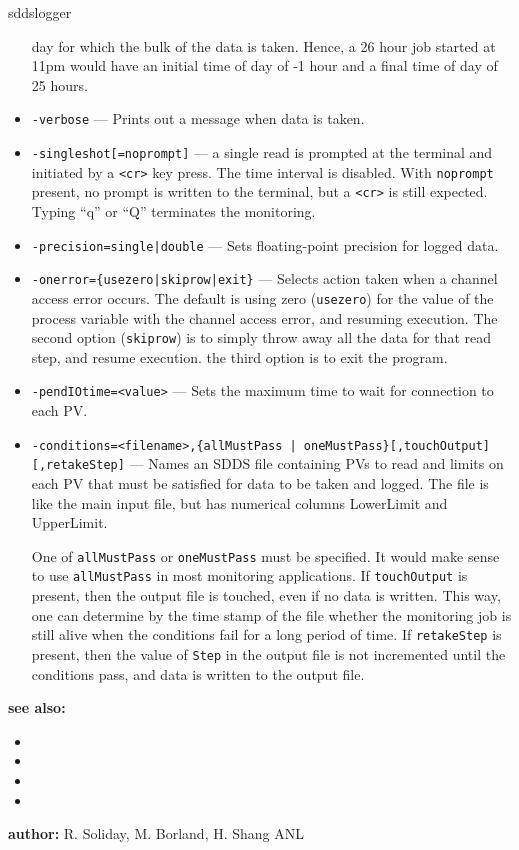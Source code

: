 \begin{sddsprog}{sddslogger}
\begin{itemize}
      day for which the bulk of the data is taken.  Hence, a 26 hour job started at 11pm would have an
      initial time of day of -1 hour and a final time of day of 25 hours.
    \item {\tt -verbose} --- Prints out a message when data is taken.
    \item {\verb+-singleshot[=noprompt]+} --- a single read is prompted at the terminal
      and initiated by a \verb+<cr>+ key press. The time interval is disabled.
      With \verb+noprompt+ present, no prompt is written to the terminal, but a \verb+<cr>+
      is still expected. Typing ``q'' or ``Q'' terminates the monitoring.
    \item {\tt -precision={single|double}} --- Sets floating-point precision for logged data.
    \item {\tt -onerror=\{usezero|skiprow|exit\}} --- Selects action taken when a channel access error occurs.
      The default is using zero ({\tt usezero}) for the value of the process variable
      with the channel access error, and resuming execution. The second option ({\tt skiprow}) is to
      simply throw away all the data for that read step, and resume execution.
      the third option is to exit the program.
    \item {\tt -pendIOtime=<value>} --- Sets the maximum time to wait for connection to each PV.
    \item {\verb+-conditions=<filename>,{allMustPass | oneMustPass}[,touchOutput][,retakeStep]+} ---
      Names an SDDS file containing PVs to read and limits on each PV that must
      be satisfied for data to be taken and logged.  The file is like the main
      input file, but has numerical columns LowerLimit and UpperLimit.

      One of \verb+allMustPass+ or \verb+oneMustPass+ must be specified. It would make sense
      to use \verb+allMustPass+ in most monitoring applications.
      If \verb+touchOutput+ is present, then the output file is touched, even if no data
      is written. This way, one can determine by the time stamp of the file
      whether the monitoring job is still alive
      when the conditions fail for a long period of time. If \verb+retakeStep+ is
      present, then the value of \verb+Step+ in the output file is not
      incremented until the conditions pass, and data is written to the output file.
  \end{itemize}

\item \textbf{see also:}
  \begin{itemize}
    \item {}
    \item {}
    \item {}
    \item {}
  \end{itemize}
\item \textbf{author:} R. Soliday, M. Borland, H. Shang ANL
\end{sddsprog}
